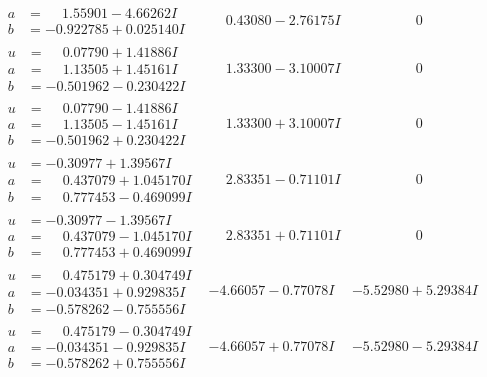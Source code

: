 \documentclass[1p]{elsarticle_modified}
\theoremstyle{definition}
\begin{document}
$$\begin{array}{c|c|c}
\begin{aligned}
a &= \phantom{-}1.55901 - 4.66262 I \\
b &= -0.922785 + 0.025140 I\end{aligned}
 & \phantom{-}0.43080 - 2.76175 I & \phantom{-0.000000 } 0 \\ \hline\begin{aligned}
u &= \phantom{-}0.07790 + 1.41886 I \\
a &= \phantom{-}1.13505 + 1.45161 I \\
b &= -0.501962 - 0.230422 I\end{aligned}
 & \phantom{-}1.33300 - 3.10007 I & \phantom{-0.000000 } 0 \\ \hline\begin{aligned}
u &= \phantom{-}0.07790 - 1.41886 I \\
a &= \phantom{-}1.13505 - 1.45161 I \\
b &= -0.501962 + 0.230422 I\end{aligned}
 & \phantom{-}1.33300 + 3.10007 I & \phantom{-0.000000 } 0 \\ \hline\begin{aligned}
u &= -0.30977 + 1.39567 I \\
a &= \phantom{-}0.437079 + 1.045170 I \\
b &= \phantom{-}0.777453 - 0.469099 I\end{aligned}
 & \phantom{-}2.83351 - 0.71101 I & \phantom{-0.000000 } 0 \\ \hline\begin{aligned}
u &= -0.30977 - 1.39567 I \\
a &= \phantom{-}0.437079 - 1.045170 I \\
b &= \phantom{-}0.777453 + 0.469099 I\end{aligned}
 & \phantom{-}2.83351 + 0.71101 I & \phantom{-0.000000 } 0 \\ \hline\begin{aligned}
u &= \phantom{-}0.475179 + 0.304749 I \\
a &= -0.034351 + 0.929835 I \\
b &= -0.578262 - 0.755556 I\end{aligned}
 & -4.66057 - 0.77078 I & -5.52980 + 5.29384 I \\ \hline\begin{aligned}
u &= \phantom{-}0.475179 - 0.304749 I \\
a &= -0.034351 - 0.929835 I \\
b &= -0.578262 + 0.755556 I\end{aligned}
 & -4.66057 + 0.77078 I & -5.52980 - 5.29384 I\\

\end{array}$$
\end{document}

